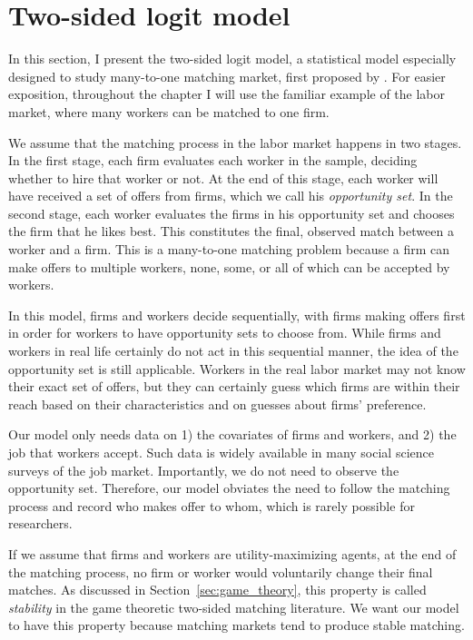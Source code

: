 \section{Two-sided logit model}

In this section, I present the two-sided logit model, a statistical model
especially designed to study many-to-one matching market, first proposed by
\cite{Logan1996}. For easier exposition, throughout the chapter I will use the
familiar example of the labor market, where many workers can be matched to one
firm.

We assume that the matching process in the labor market happens in two stages.
In the first stage, each firm evaluates each worker in the sample, deciding
whether to hire that worker or not. At the end of this stage, each worker will
have received a set of offers from firms, which we call his \textit{opportunity
  set}. In the second stage, each worker evaluates the firms in his opportunity
set and chooses the firm that he likes best. This constitutes the final,
observed match between a worker and a firm. This is a many-to-one matching
problem because a firm can make offers to multiple workers, none, some, or all
of which can be accepted by workers.

In this model, firms and workers decide sequentially, with firms making offers
first in order for workers to have opportunity sets to choose from. While firms
and workers in real life certainly do not act in this sequential manner, the
idea of the opportunity set is still applicable. Workers in the real labor
market may not know their exact set of offers, but they can certainly guess
which firms are within their reach based on their characteristics and on guesses
about firms' preference.

Our model only needs data on 1) the covariates of firms and workers, and 2) the
job that workers accept. Such data is widely available in many social science
surveys of the job market. Importantly, we do not need to observe the
opportunity set. Therefore, our model obviates the need to follow the matching
process and record who makes offer to whom, which is rarely possible for
researchers.

If we assume that firms and workers are utility-maximizing agents, at the end of
the matching process, no firm or worker would voluntarily change their final
matches. As discussed in Section~\ref{sec:game_theory}, this property is called
\textit{stability} in the game theoretic two-sided matching literature. We want
our model to have this property because matching markets tend to produce stable
matching.

